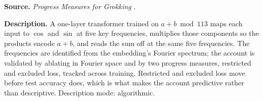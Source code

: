 
\textbf{Source.} \emph{Progress Measures for Grokking} \citep{nanda2023progress}.

\textbf{Description.} A one-layer transformer trained on $a+b \bmod 113$ maps each input to $\cos$ and $\sin$ at five key frequencies, multiplies those components so the products encode $a+b$, and reads the sum off at the same five frequencies. The frequencies are identified from the embedding's Fourier spectrum; the account is validated by ablating in Fourier space and by two progress measures, restricted and excluded loss, tracked across training. Restricted and excluded loss move before test accuracy does, which is what makes the account predictive rather than descriptive. Description mode: algorithmic.


